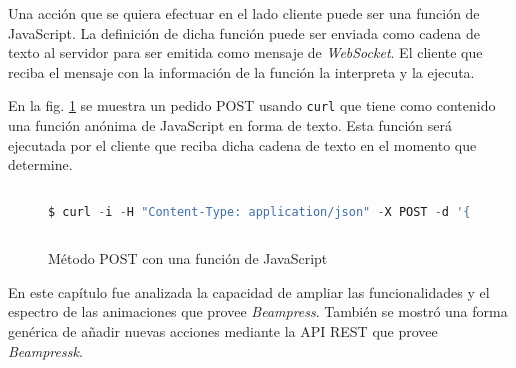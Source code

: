 		Una acción que se quiera efectuar en el lado cliente puede ser una función de JavaScript. La definición de dicha función puede ser enviada como cadena de texto al servidor para ser emitida como mensaje de \textit{WebSocket}. El cliente que reciba el mensaje con la información de la función la interpreta y la ejecuta. 

		En la fig. \ref{fig:java_post} se muestra un pedido POST usando \texttt{curl} que tiene como contenido una función anónima de JavaScript en forma de texto. Esta función será ejecutada por el cliente que reciba dicha cadena de texto en el momento que determine. 

			\begin{figure}[htb]%
				\begin{lstlisting}[language=Python]%

$ curl -i -H "Content-Type: application/json" -X POST -d '{"action":"function", "data":"var miFuncion = function(){/*Código que se quiera ejecutar*/};"}' http://beampressk.com:5000/action
  
				\end{lstlisting}
			\caption{Método POST con una función de JavaScript}
			\label{fig:java_post}
			\end{figure}		

	En este capítulo fue analizada la capacidad de ampliar las funcionalidades y el espectro de las animaciones que provee \textit{Beampress}. También se mostró una forma genérica de añadir nuevas acciones mediante la API REST que provee \textit{Beampressk}.
	
